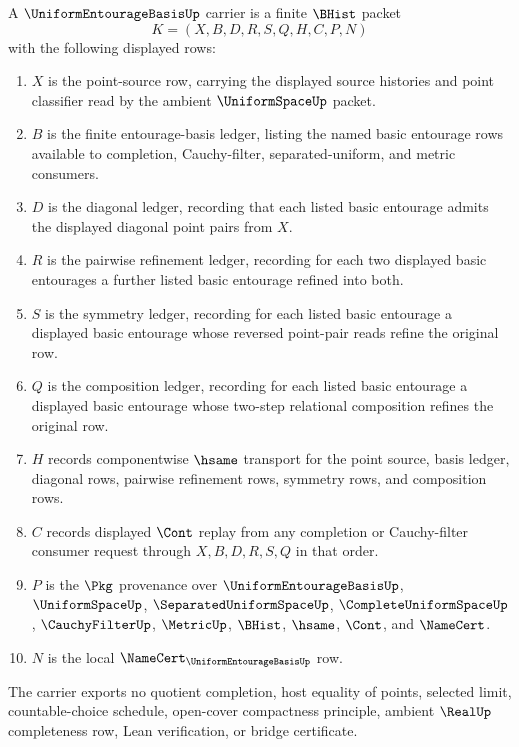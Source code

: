 \begin{definition}
\label{def:uniform-entourage-basis-carrier}
A $\UniformEntourageBasisUp$ carrier is a finite $\BHist$ packet
$$
K=(X,B,D,R,S,Q,H,C,P,N)
$$
with the following displayed rows:
\begin{enumerate}
\item $X$ is the point-source row, carrying the displayed source histories and point classifier read by the ambient $\UniformSpaceUp$ packet.
\item $B$ is the finite entourage-basis ledger, listing the named basic entourage rows available to completion, Cauchy-filter, separated-uniform, and metric consumers.
\item $D$ is the diagonal ledger, recording that each listed basic entourage admits the displayed diagonal point pairs from $X$.
\item $R$ is the pairwise refinement ledger, recording for each two displayed basic entourages a further listed basic entourage refined into both.
\item $S$ is the symmetry ledger, recording for each listed basic entourage a displayed basic entourage whose reversed point-pair reads refine the original row.
\item $Q$ is the composition ledger, recording for each listed basic entourage a displayed basic entourage whose two-step relational composition refines the original row.
\item $H$ records componentwise $\hsame$ transport for the point source, basis ledger, diagonal rows, pairwise refinement rows, symmetry rows, and composition rows.
\item $C$ records displayed $\Cont$ replay from any completion or Cauchy-filter consumer request through $X,B,D,R,S,Q$ in that order.
\item $P$ is the $\Pkg$ provenance over $\UniformEntourageBasisUp$, $\UniformSpaceUp$, $\SeparatedUniformSpaceUp$, $\CompleteUniformSpaceUp$, $\CauchyFilterUp$, $\MetricUp$, $\BHist$, $\hsame$, $\Cont$, and $\NameCert$.
\item $N$ is the local $\NameCert_{\UniformEntourageBasisUp}$ row.
\end{enumerate}
The carrier exports no quotient completion, host equality of points, selected limit, countable-choice schedule, open-cover compactness principle, ambient $\RealUp$ completeness row, Lean verification, or bridge certificate.
\end{definition}

